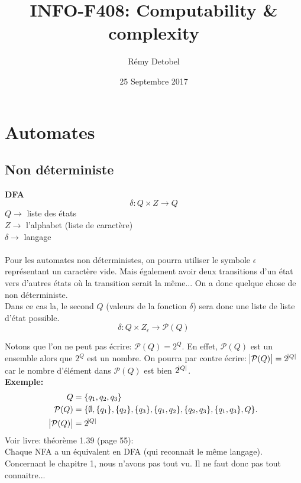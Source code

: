 \documentclass[a4paper,12pt]{article}
\title{INFO-F408: Computability \& complexity}
\author{Rémy Detobel}
\date{25 Septembre 2017}
\begin{document}
\maketitle
\newpage

\section{Automates}
  \subsection{Non déterministe}
    \textbf{DFA}
    $$\delta : Q \times Z \rightarrow Q$$
    $Q \rightarrow$ liste des états\\
    $Z \rightarrow$ l'alphabet (liste de caractère)\\
    $\delta \rightarrow$ langage\\
    \\
    Pour les automates non déterministes, on pourra utiliser le symbole $\epsilon$ représentant un caractère vide.  Mais également avoir deux transitions d'un état vers d'autres états où la transition serait la même...  On a donc quelque chose de non déterministe.\\
    Dans ce cas la, le second $Q$ (valeurs de la fonction $\delta$) sera donc une liste de liste d'état possible.\\
    $$\delta : Q \times Z_{\epsilon} \rightarrow \mathcal P(Q)$$
    
    Notons que l'on ne peut pas écrire: $\mathcal P(Q) = 2^Q$.  En effet, $\mathcal P(Q)$ est un ensemble alors que $2^Q$ est un nombre.  On pourra par contre écrire: $\abs {\mathcal P(Q)} = 2^{\abs {Q}}$ car le nombre d'élément dans $\mathcal P(Q)$ est bien $2^{\abs {Q}}$.
		\\
    \textbf{Exemple:}\\
    \begin{align*}
      Q &= \{q_1, q_2, q_3\}\\
      \mathcal P(Q) &= \{\emptyset, \{q_1\}, \{q_2\}, \{q_3\}, \{q_1, q_2\}, \{q_2, q_3\}, \{q_1, q_3\}, Q\}.\\
      \abs {\mathcal P(Q)} &= 2^{\abs Q}
    \end{align*}
    Voir livre: théorème 1.39 (page 55):\\
    Chaque NFA a un équivalent en DFA (qui reconnait le même langage).\\
    Concernant le chapitre 1, nous n'avons pas tout vu. Il ne faut donc pas tout connaitre...
\end{document}
